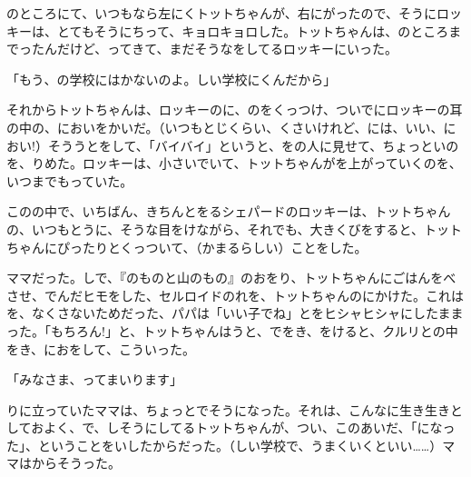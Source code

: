 のところにて、いつもなら左にくトットちゃんが、右にがったので、そうにロッキーは、とてもそうにちって、キョロキョロした。トットちゃんは、のところまでったんだけど、ってきて、まだそうなをしてるロッキーにいった。

「もう、の学校にはかないのよ。しい学校にくんだから」

それからトットちゃんは、ロッキーのに、のをくっつけ、ついでにロッキーの耳の中の、においをかいだ。（いつもとじくらい、くさいけれど、には、いい、におい!）そううとをして、「バイバイ」というと、をの人に見せて、ちょっといのを、りめた。ロッキーは、小さいでいて、トットちゃんがを上がっていくのを、いつまでもっていた。

このの中で、いちばん、きちんとをるシェパードのロッキーは、トットちゃんの、いつもとうに、そうな目をけながら、それでも、大きくびをすると、トットちゃんにぴったりとくっついて、（かまるらしい）ことをした。

ママだった。しで、『のものと山のもの』のおをり、トットちゃんにごはんをべさせ、でんだヒモをした、セルロイドのれを、トットちゃんのにかけた。これはを、なくさないためだった、パパは「いい子でね」とをヒシャヒシャにしたままった。「もちろん!」と、トットちゃんはうと、でをき、をけると、クルリとの中をき、におをして、こういった。

「みなさま、ってまいります」

りに立っていたママは、ちょっとでそうになった。それは、こんなに生き生きとしておよく、で、しそうにしてるトットちゃんが、つい、このあいだ、「になった」、ということをいしたからだった。（しい学校で、うまくいくといい……）ママはからそうった。

